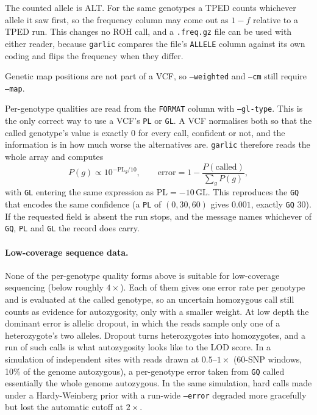 \documentclass[12pt]{article}%
\begin{document}
The counted allele is ALT.  For the same genotypes a TPED counts whichever allele it saw first, so the frequency column may come out as $1-f$ relative to a TPED run.  This changes no ROH call, and a {\tt .freq.gz} file can be used with either reader, because {\tt garlic} compares the file's {\tt ALLELE} column against its own coding and flips the frequency when they differ.

Genetic map positions are not part of a VCF, so {\tt --weighted} and {\tt --cm} still require {\tt --map}.

Per-genotype qualities are read from the {\tt FORMAT} column with {\tt --gl-type}.  This is the only correct way to use a VCF's {\tt PL} or {\tt GL}.  A VCF normalises both so that the called genotype's value is exactly $0$ for every call, confident or not, and the information is in how much worse the alternatives are.  {\tt garlic} therefore reads the whole array and computes
\[ P(g) \propto 10^{-\mathrm{PL}_g/10}, \qquad \mathrm{error} = 1 - \frac{P(\mathrm{called})}{\sum_g P(g)}, \]
with {\tt GL} entering the same expression as $\mathrm{PL} = -10\,\mathrm{GL}$.  This reproduces the {\tt GQ} that encodes the same confidence (a {\tt PL} of $(0,30,60)$ gives $0.001$, exactly {\tt GQ} $30$).  If the requested field is absent the run stops, and the message names whichever of {\tt GQ}, {\tt PL} and {\tt GL} the record does carry.

\paragraph{Low-coverage sequence data.}  None of the per-genotype quality forms above is suitable for low-coverage sequencing (below roughly $4\times$).  Each of them gives one error rate per genotype and is evaluated at the called genotype, so an uncertain homozygous call still counts as evidence for autozygosity, only with a smaller weight.  At low depth the dominant error is allelic dropout, in which the reads sample only one of a heterozygote's two alleles.  Dropout turns heterozygotes into homozygotes, and a run of such calls is what autozygosity looks like to the LOD score.  In a simulation of independent sites with reads drawn at $0.5$--$1\times$ (60-SNP windows, 10\% of the genome autozygous), a per-genotype error taken from {\tt GQ} called essentially the whole genome autozygous.  In the same simulation, hard calls made under a Hardy-Weinberg prior with a run-wide {\tt --error} degraded more gracefully but lost the automatic cutoff at $2\times$.
\end{document}
